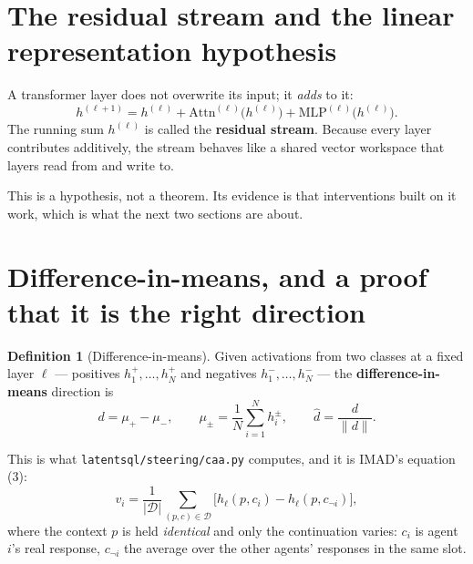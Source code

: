\documentclass[11pt]{article}
\theoremstyle{definition}
\newtheorem{definition}[theorem]{Definition}
\begin{document}
\section{The residual stream and the linear representation hypothesis}

A transformer layer does not overwrite its input; it \emph{adds} to it:
\[
h^{(\ell+1)} = h^{(\ell)} + \mathrm{Attn}^{(\ell)}\big(h^{(\ell)}\big) + \mathrm{MLP}^{(\ell)}\big(h^{(\ell)}\big).
\]
The running sum $h^{(\ell)}$ is called the \textbf{residual stream}. Because every layer contributes additively, the stream behaves like a shared vector workspace that layers read from and write to.

\begin{center}
\end{center}

This is a hypothesis, not a theorem. Its evidence is that interventions built on it work, which is what the next two sections are about.

\section{Difference-in-means, and a proof that it is the right direction}

\begin{definition}[Difference-in-means]
\label{def:diff-in-means}
Given activations from two classes at a fixed layer $\ell$ --- positives $h^+_1,\dots,h^+_N$ and negatives $h^-_1,\dots,h^-_N$ --- the \textbf{difference-in-means} direction is
\[
d = \mu_+ - \mu_-,\qquad
\mu_\pm = \frac{1}{N}\sum_{i=1}^{N}h^{\pm}_i,
\qquad
\hat d = \frac{d}{\|d\|}.
\tag{6.1}
\]
\end{definition}

This is what \texttt{latentsql/steering/caa.py} computes, and it is IMAD's equation (3):
\[
v_i = \frac{1}{|\mathcal{D}|}\sum_{(p,c)\in\mathcal{D}}
\Big[h_\ell(p, c_i) - h_\ell(p, c_{\neg i})\Big],
\]
where the context $p$ is held \emph{identical} and only the continuation varies: $c_i$ is agent $i$'s real response, $c_{\neg i}$ the average over the other agents' responses in the same slot.
\end{document}
